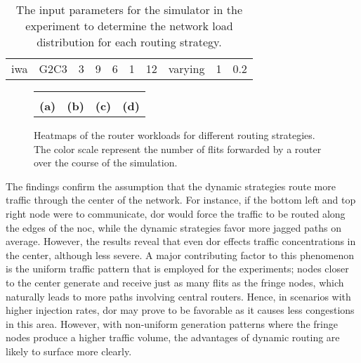 \begin{table}
    \centering
    \begin{tabulary}{\textwidth}{C|C|C|C|C|C|C|C|C|C}
        \pProtVar{} & \pNCMode{} & \pEncMods{} & \pAuthMods{} & \pRQSize{} & \pARQLimit{} & \pARQTimeout{} & \pRStrat{} & \pAttackerSet{} & \pAttackProb{} \\\hline
        \gls{iwa} & G2C3 & 3 & 9 & 6 & 1 & 12 & varying & 1 & 0.2 \\
    \end{tabulary}
    \caption[Input parameters for routing heatmap comparison]{The input parameters for the simulator in the experiment to determine the network load
    distribution for each routing strategy.}
    \label{tab:setuproutingheatmaps}
\end{table}

\begin{figure}
    \centering
    \begin{tabular}{cccc}
         &  &
         &  \\
        \hspace*{0.3em}\footnotesize\textbf{(a)} & \hspace*{0.3em}\footnotesize\textbf{(b)} &
        \hspace*{0.3em}\footnotesize\textbf{(c)} & \footnotesize\textbf{(d)}\hspace*{3.6em} \\
    \end{tabular}
    \caption[Heatmaps of the routers for different routing strategies]{Heatmaps of the router workloads for different routing strategies. The color
    scale represent the number of flits forwarded by a router over the course of the simulation.}
    \label{fig:resultsroutingstratheatmaps}
\end{figure}

The findings confirm the assumption that the dynamic strategies route more traffic through the center of the network. For instance, if the bottom
left and top right node were to communicate, \gls{dor} would force the traffic to be routed along the edges of the \gls{noc}, while the dynamic
strategies favor more jagged paths on average. However, the results reveal that even \gls{dor} effects traffic concentrations in the center, although
less severe. A major contributing factor to this phenomenon is the uniform traffic pattern that is employed for the experiments; nodes closer to the
center generate and receive just as many flits as the fringe nodes, which naturally leads to more paths involving central routers. Hence, in scenarios
with higher injection rates, \gls{dor} may prove to be favorable as it causes less congestions in this area. However, with non-uniform generation
patterns where the fringe nodes produce a higher traffic volume, the advantages of dynamic routing are likely to surface more clearly.

